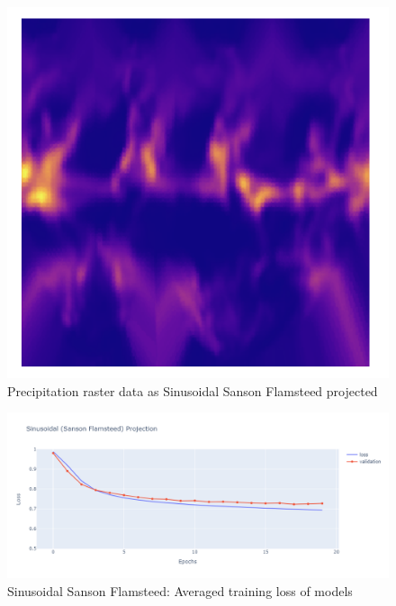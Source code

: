 \begin{figure}[H]
\begin{minipage}{0.30\textwidth}
        \label{fig:ig_proj}
    \end{minipage}\hfill
    \begin{minipage}{0.30\textwidth}
        \centering
        \includegraphics[width=0.9\linewidth]{figures/chapter-8/prect_goode.png}
        \caption{Precipitation raster data as Sinusoidal Sanson Flamsteed projected}
        \label{fig:ig_prect_raster}
    \end{minipage}\hfill
\end{figure}


\begin{figure}[H]
    \centering
    \includegraphics[width=1.0\linewidth]{figures/chapter-8/sinu_loss.png}
    \caption{Sinusoidal Sanson Flamsteed: Averaged training loss of models  }
    \label{fig:sinu_loss}
\end{figure}


